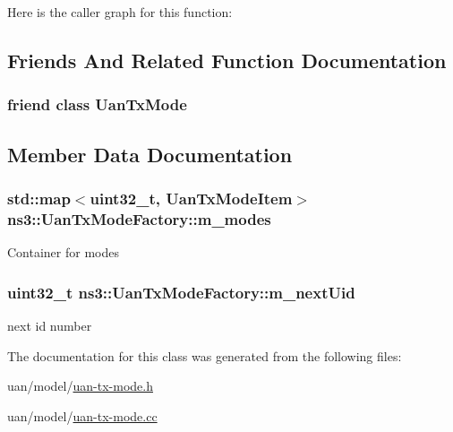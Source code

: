 Here is the caller graph for this function\+:




\subsection{Friends And Related Function Documentation}
\subsubsection[{\texorpdfstring{Uan\+Tx\+Mode}{UanTxMode}}]{\setlength{\rightskip}{0pt plus 5cm}friend class {\bf Uan\+Tx\+Mode}\hspace{0.3cm}{\ttfamily [friend]}}\hypertarget{classns3_1_1UanTxModeFactory_ae8bf609f60f00cdc6f02713e8cfc8561}{}\label{classns3_1_1UanTxModeFactory_ae8bf609f60f00cdc6f02713e8cfc8561}


\subsection{Member Data Documentation}
\subsubsection[{\texorpdfstring{m\+\_\+modes}{m_modes}}]{\setlength{\rightskip}{0pt plus 5cm}std\+::map$<$uint32\+\_\+t, {\bf Uan\+Tx\+Mode\+Item}$>$ ns3\+::\+Uan\+Tx\+Mode\+Factory\+::m\+\_\+modes\hspace{0.3cm}{\ttfamily [private]}}\hypertarget{classns3_1_1UanTxModeFactory_a592ab5ded8cde17edfd0ad97766df7a7}{}\label{classns3_1_1UanTxModeFactory_a592ab5ded8cde17edfd0ad97766df7a7}
Container for modes 
\subsubsection[{\texorpdfstring{m\+\_\+next\+Uid}{m_nextUid}}]{\setlength{\rightskip}{0pt plus 5cm}uint32\+\_\+t ns3\+::\+Uan\+Tx\+Mode\+Factory\+::m\+\_\+next\+Uid\hspace{0.3cm}{\ttfamily [private]}}\hypertarget{classns3_1_1UanTxModeFactory_af0235fcd5bdfa884646d9c914ad1f1cb}{}\label{classns3_1_1UanTxModeFactory_af0235fcd5bdfa884646d9c914ad1f1cb}


next id number 



The documentation for this class was generated from the following files\+:\begin{DoxyCompactItemize}
\item 
uan/model/\hyperlink{uan-tx-mode_8h}{uan-\/tx-\/mode.\+h}\item 
uan/model/\hyperlink{uan-tx-mode_8cc}{uan-\/tx-\/mode.\+cc}\end{DoxyCompactItemize}
